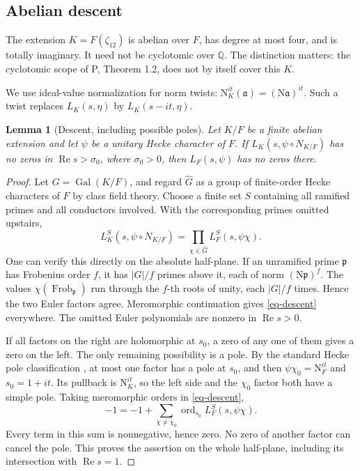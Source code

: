 \documentclass[11pt,a4paper]{article}
\newtheorem{lemma}[theorem]{Lemma}
\theoremstyle{remark}\newtheorem{remark}[theorem]{Remark}
\newcommand{\N}{\mathrm N}
\newcommand{\Rea}{\operatorname{Re}}
\numberwithin{equation}{section}
\begin{document}
\subsection{Abelian descent}

The extension $K=F(\zeta_{12})$ is abelian over $F$, has degree at
most four, and is totally imaginary. It need not be cyclotomic over
$\mathbb Q$. The distinction matters: the cyclotomic scope of P,
Theorem 1.2, does not by itself cover this $K$.

We use ideal-value normalization for norm twists:
$\N_K^{it}(\mathfrak a)=(\N\mathfrak a)^{it}$.
Such a twist replaces $L_K(s,\eta)$ by $L_K(s-it,\eta)$.

\begin{lemma}[Descent, including possible poles]\label{lem-descent}
Let $K/F$ be a finite abelian extension and let $\psi$ be a unitary
Hecke character of $F$. If $L_K(s,\psi\circ N_{K/F})$ has no zeros
in $\Rea s>\sigma_0$, where $\sigma_0>0$, then
$L_F(s,\psi)$ has no zeros there.
\end{lemma}

\begin{proof}
Let $G=\operatorname{Gal}(K/F)$, and regard $\widehat G$ as a group
of finite-order Hecke characters of $F$ by class field theory.
Choose a finite set $S$ containing all ramified primes and all
conductors involved. With the corresponding primes omitted upstairs,
\begin{equation}\label{eq-descent}
 L_K^S(s,\psi\circ N_{K/F})
       =\prod_{\chi\in\widehat G}L_F^S(s,\psi\chi).
\end{equation}
One can verify this directly on the absolute half-plane. If an
unramified prime $\mathfrak p$ has Frobenius order $f$, it has
$|G|/f$ primes above it, each of norm $(\N\mathfrak p)^f$.
The values $\chi(\operatorname{Frob}_{\mathfrak p})$ run through
the $f$-th roots of unity, each $|G|/f$ times. Hence the two Euler
factors agree. Meromorphic continuation gives \eqref{eq-descent}
everywhere. The omitted Euler polynomials are nonzero in
$\Rea s>0$.

If all factors on the right are holomorphic at $s_0$, a zero of any
one of them gives a zero on the left. The only remaining possibility
is a pole. By the standard Hecke pole classification \cite{Tate},
at most one factor has a pole at $s_0$, and then
$\psi\chi_0=\N_F^{it}$ and $s_0=1+it$. Its pullback is
$\N_K^{it}$, so the left side and the $\chi_0$ factor both have
a simple pole. Taking meromorphic orders in \eqref{eq-descent},
\[
 -1=-1+\sum_{\chi\ne\chi_0}
              \operatorname{ord}_{s_0}L_F^S(s,\psi\chi).
\]
Every term in this sum is nonnegative, hence zero. No zero of
another factor can cancel the pole. This proves the assertion
on the whole half-plane, including its intersection with $\Rea s=1$.
\end{proof}
\end{document}
